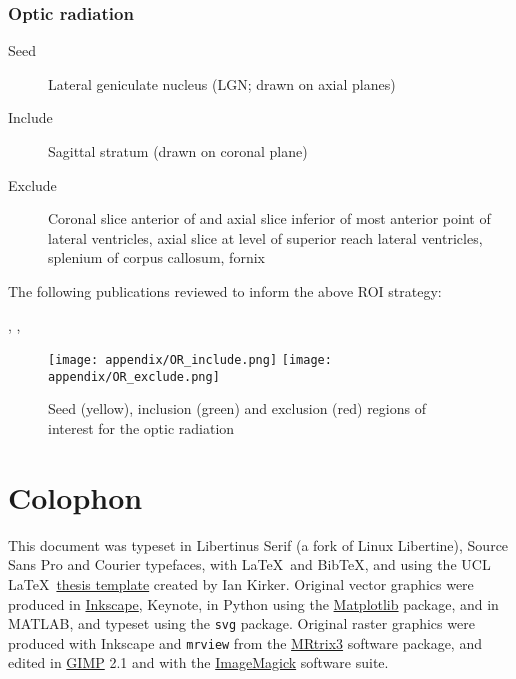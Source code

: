 \documentclass[12pt,phd,a4paper,twoside]{ucl_thesis}
\renewcommand{\textcite}[2][]{
\ifthenelse { \equal {#1} {} }  {\citeauthor{#2}\autocite{#2}}   {\citeauthor{#1}\autocite{#2}}}
\begin{document}
\subsection{Optic radiation}

\begin{description}
  \item[Seed] Lateral geniculate nucleus (LGN; drawn on axial planes)
  \item[Include] Sagittal stratum (drawn on coronal plane)
  \item[Exclude] Coronal slice anterior of and axial slice inferior of most anterior point of lateral ventricles, axial slice at level of superior reach lateral ventricles, splenium of corpus callosum, fornix
\end{description}

The following publications reviewed to inform the above ROI strategy:
\textcite{Yogarajah2009},\textcite{Hofer2010},\textcite{Dayan2015}

\begin{figure*}[h]
  \centering
    \texttt{[image: appendix/OR\_include.png]}
    \texttt{[image: appendix/OR\_exclude.png]}
  \caption[Optic radiation tractography ROIs]{Seed (yellow), inclusion (green) and exclusion (red) regions of interest for the optic radiation}
  \label{fig:rois.or}
\end{figure*}
\clearpage{}

{
\printbibliography
}
\chapter*{Colophon}

This document was typeset in Libertinus Serif (a fork of Linux Libertine), {\sffamily Source Sans Pro} and {\ttfamily Courier} typefaces, with \LaTeX\ and Bib\TeX, and using the UCL \LaTeX\ \href{https://github.com/UCL/ucl-latex-thesis-templates}{thesis template} created by Ian Kirker.
Original vector graphics were produced in \href{https://inkscape.org/}{Inkscape}, Keynote, in Python using the \href{https://matplotlib.org/}{Matplotlib} package, and in MATLAB, and typeset using the \verb|svg| package.
Original raster graphics were produced with Inkscape and \verb|mrview| from the \href{https://www.mrtrix.org/}{MRtrix3} software package, and edited in \href{https://www.gimp.org/}{GIMP} 2.1 and with the \href{https://imagemagick.org/index.php}{ImageMagick} software suite.
\end{document}
